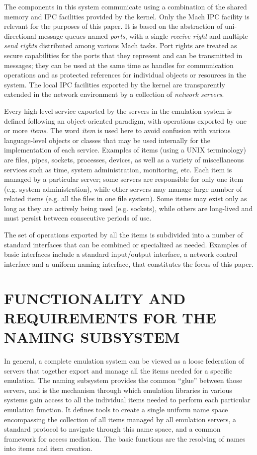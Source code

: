 The components in this system communicate using a combination of the
shared memory and IPC facilities provided by the kernel.  Only the
Mach IPC facility is relevant for the purposes of this paper. It is
based on the abstraction of uni-directional message queues named {\em
ports}, with a single {\em receive right} and multiple {\em send
rights} distributed among various Mach tasks. Port rights are treated
as secure capabilities for the ports that they represent and can be
transmitted in messages; they can be used at the same time as handles
for communication operations and as protected references for
individual objects or resources in the system. The local IPC
facilities exported by the kernel are transparently extended in the
network environment by a collection of {\em network
servers}\cite{SANSOM86}.

Every high-level service exported by the servers in the emulation
system is defined following an object-oriented paradigm, with
operations exported by one or more {\em items}.  The word {\em item}
is used here to avoid confusion with various language-level objects or
classes that may be used internally for the implementation of each
service.  Examples of items (using a UNIX terminology) are files,
pipes, sockets, processes, devices, as well as a variety of
miscellaneous services such as time, system administration,
monitoring, etc. Each item is managed by a particular server; some
servers are responsible for only one item (e.g. system
administration), while other servers may manage large number of
related items (e.g. all the files in one file system).  Some items may
exist only as long as they are actively being used (e.g. sockets),
while others are long-lived and must persist between consecutive
periods of use.

The set of operations exported by all the items is subdivided into a
number of standard interfaces that can be combined or specialized as
needed. Examples of basic interfaces include a standard input/output
interface, a network control interface and a uniform naming interface,
that constitutes the focus of this paper.

\section{FUNCTIONALITY AND REQUIREMENTS FOR THE NAMING SUBSYSTEM}

In general, a complete emulation system can be viewed as a loose
federation of servers that together export and manage all the items
needed for a specific emulation.  The naming subsystem provides the
common ``glue'' between those servers, and is the mechanism through
which emulation libraries in various systems gain access to all the
individual items needed to perform each particular emulation function.
It defines tools to create a single uniform name space encompassing
the collection of all items managed by all emulation servers, a
standard protocol to navigate through this name space, and a common
framework for access mediation. The basic functions are the resolving
of names into items and item creation.

